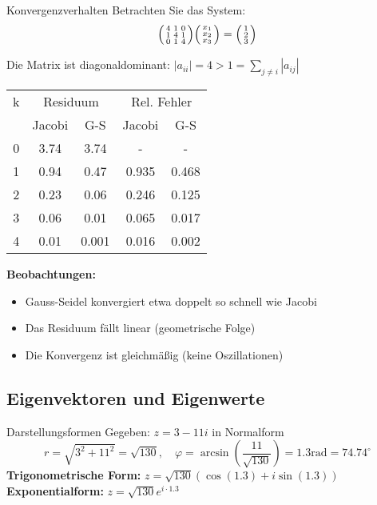 \begin{example2}{Konvergenzverhalten}
Betrachten Sie das System:
$$\begin{psmallmatrix}
4 & 1 & 0\\
1 & 4 & 1\\
0 & 1 & 4
\end{psmallmatrix}
\begin{psmallmatrix}
x_1\\
x_2\\
x_3
\end{psmallmatrix} =
\begin{psmallmatrix}
1\\
2\\
3
\end{psmallmatrix}$$

Die Matrix ist diagonaldominant:
$|a_{ii}| = 4 > 1 = \sum_{j\neq i} |a_{ij}|$

\begin{center}
\begin{tabular}{c|cc|cc}
k & \multicolumn{2}{c|}{Residuum} & \multicolumn{2}{c}{Rel. Fehler}\\
& Jacobi & G-S & Jacobi & G-S\\
\hline
0 & 3.74 & 3.74 & - & -\\
1 & 0.94 & 0.47 & 0.935 & 0.468\\
2 & 0.23 & 0.06 & 0.246 & 0.125\\
3 & 0.06 & 0.01 & 0.065 & 0.017\\
4 & 0.01 & 0.001 & 0.016 & 0.002
\end{tabular}
\end{center}

\textbf{Beobachtungen:}
\begin{itemize}
    \item Gauss-Seidel konvergiert etwa doppelt so schnell wie Jacobi
    \item Das Residuum fällt linear (geometrische Folge)
    \item Die Konvergenz ist gleichmäßig (keine Oszillationen)
\end{itemize}
\end{example2}

\subsection{Eigenvektoren und Eigenwerte}

\begin{example2}{Darstellungsformen}
Gegeben: $z = 3 - 11i$ in Normalform
$$r = \sqrt{3^2 + 11^2} = \sqrt{130}, \quad \varphi = \arcsin(\frac{11}{\sqrt{130}}) = 1.3 \text{rad} = 74.74^{\circ}$$
\textbf{Trigonometrische Form:} $z = \sqrt{130}(\cos(1.3) + i\sin(1.3))$
\vspace{2mm}\\
\textbf{Exponentialform:} $z = \sqrt{130}e^{i\cdot 1.3}$
\end{example2}

